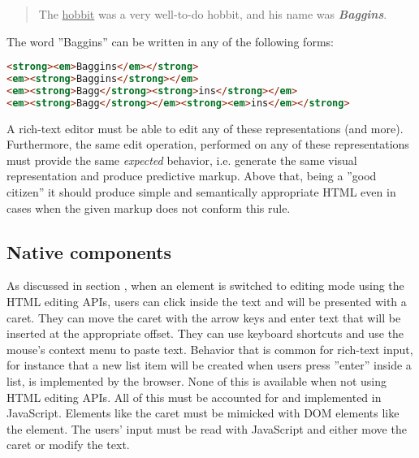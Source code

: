 \begin{quotation}
The \underline{hobbit} was a very well-to-do hobbit, and his name was \textbf{\textit{Baggins}}.
\end{quotation}

\noindent The word ''Baggins'' can be written in any of the following forms:

\begin{lstlisting}[language=html, caption=Different DOM representations of an equally formatted text, label=lst:different-dom-representations]
<strong><em>Baggins</em></strong>
<em><strong>Baggins</strong></em>
<em><strong>Bagg</strong><strong>ins</strong></em>
<em><strong>Bagg</strong></em><strong><em>ins</em></strong>
\end{lstlisting}

A rich-text editor must be able to edit any of these representations (and more). Furthermore, the same edit operation, performed on any of these representations must provide the same \textit{expected} behavior, i.e. generate the same visual representation and produce predictive markup. Above that, being a ''good citizen'' it should produce simple and semantically appropriate HTML even in cases when the given markup does not conform this rule.%




\subsection{Native components}
\label{subsec:disadv_mimic_native}

As discussed in section , when an element is switched to editing mode using the HTML editing APIs, users can click inside the text and will be presented with a caret. They can move the caret with the arrow keys and enter text that will be inserted at the appropriate offset. They can use keyboard shortcuts and use the mouse's context menu to paste text. Behavior that is common for rich-text input, for instance that a new list item will be created when users press ''enter'' inside a list, is implemented by the browser. None of this is available when not using HTML editing APIs. All of this must be accounted for and implemented in JavaScript. Elements like the caret must be mimicked with DOM elements like the  element. The users' input must be read with JavaScript and either move the caret or modify the text.

